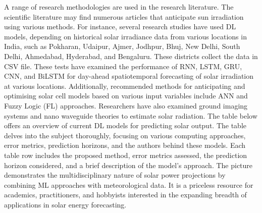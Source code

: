 A range of research methodologies are used in the research literature. The scientific literature may find numerous articles that anticipate sun irradiation using various methods. For instance, several research studies have used DL models, depending on historical solar irradiance data from various locations in India, such as Pokharan, Udaipur, Ajmer, Jodhpur, Bhuj, New Delhi, South Delhi, Ahmedabad, Hyderabad, and Bengaluru. These districts collect the data in CSV file\cite{kumari2021deep}. These tests have examined the performance of RNN, LSTM, GRU, CNN, and BiLSTM for day-ahead spatiotemporal forecasting of solar irradiation at various locations. Additionally, recommended methods for anticipating and optimising solar cell models based on various input variables include ANN and Fuzzy Logic (FL) approaches. Researchers have also examined ground imaging systems and nano waveguide theories to estimate solar radiation\cite{kumari2021deep}. The table below offers an overview of current DL models for predicting solar output. The table delves into the subject thoroughly, focusing on various computing approaches, error metrics, prediction horizons, and the authors behind these models. Each table row includes the proposed method, error metrics assessed, the prediction horizon considered, and a brief description of the model's approach. The picture demonstrates the multidisciplinary nature of solar power projections by combining ML approaches with meteorological data. It is a priceless resource for academics, practitioners, and hobbyists interested in the expanding breadth of applications in solar energy forecasting.

